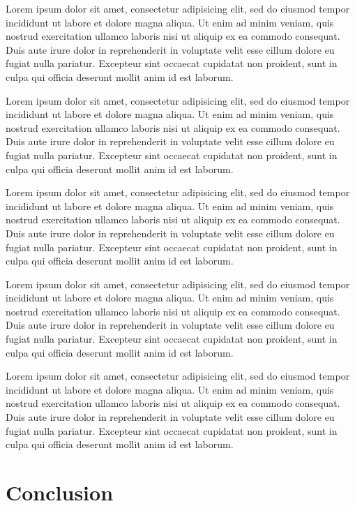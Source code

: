 \documentclass[conference]{acmsiggraph}
\begin{document}
{Lorem ipsum dolor sit amet, consectetur adipisicing elit, sed do
eiusmod tempor incididunt ut labore et dolore magna aliqua. Ut enim ad
minim veniam, quis nostrud exercitation ullamco laboris nisi ut
aliquip ex ea commodo consequat. Duis aute irure dolor in
reprehenderit in voluptate velit esse cillum dolore eu fugiat nulla
pariatur. Excepteur sint occaecat cupidatat non proident, sunt in
culpa qui officia deserunt mollit anim id est laborum.

Lorem ipsum dolor sit amet, consectetur adipisicing elit, sed do
eiusmod tempor incididunt ut labore et dolore magna aliqua. Ut enim ad
minim veniam, quis nostrud exercitation ullamco laboris nisi ut
aliquip ex ea commodo consequat. Duis aute irure dolor in
reprehenderit in voluptate velit esse cillum dolore eu fugiat nulla
pariatur. Excepteur sint occaecat cupidatat non proident, sunt in
culpa qui officia deserunt mollit anim id est laborum.

Lorem ipsum dolor sit amet, consectetur adipisicing elit, sed do
eiusmod tempor incididunt ut labore et dolore magna aliqua. Ut enim ad
minim veniam, quis nostrud exercitation ullamco laboris nisi ut
aliquip ex ea commodo consequat. Duis aute irure dolor in
reprehenderit in voluptate velit esse cillum dolore eu fugiat nulla
pariatur. Excepteur sint occaecat cupidatat non proident, sunt in
culpa qui officia deserunt mollit anim id est laborum.

Lorem ipsum dolor sit amet, consectetur adipisicing elit, sed do
eiusmod tempor incididunt ut labore et dolore magna aliqua. Ut enim ad
minim veniam, quis nostrud exercitation ullamco laboris nisi ut
aliquip ex ea commodo consequat. Duis aute irure dolor in
reprehenderit in voluptate velit esse cillum dolore eu fugiat nulla
pariatur. Excepteur sint occaecat cupidatat non proident, sunt in
culpa qui officia deserunt mollit anim id est laborum.

Lorem ipsum dolor sit amet, consectetur adipisicing elit, sed do
eiusmod tempor incididunt ut labore et dolore magna aliqua. Ut enim ad
minim veniam, quis nostrud exercitation ullamco laboris nisi ut
aliquip ex ea commodo consequat. Duis aute irure dolor in
reprehenderit in voluptate velit esse cillum dolore eu fugiat nulla
pariatur. Excepteur sint occaecat cupidatat non proident, sunt in
culpa qui officia deserunt mollit anim id est laborum.

\section{Conclusion}

}
\end{document}
